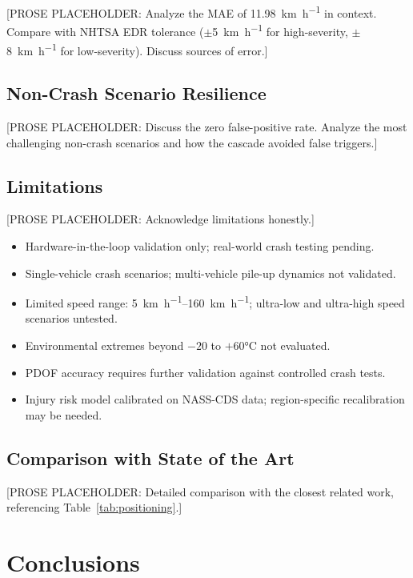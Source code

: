 \documentclass[conference,twocolumn]{IEEEtran}
\begin{document}
[PROSE PLACEHOLDER: Analyze the MAE of \SI{11.98}{\kilo\meter\per\hour} in context. Compare with NHTSA EDR tolerance ($\pm$\SI{5}{\kilo\meter\per\hour} for high-severity, $\pm$\SI{8}{\kilo\meter\per\hour} for low-severity). Discuss sources of error.]

\subsection{Non-Crash Scenario Resilience}

[PROSE PLACEHOLDER: Discuss the zero false-positive rate. Analyze the most challenging non-crash scenarios and how the cascade avoided false triggers.]

\subsection{Limitations}

[PROSE PLACEHOLDER: Acknowledge limitations honestly.]

\begin{itemize}
  \item Hardware-in-the-loop validation only; real-world crash testing pending.
  \item Single-vehicle crash scenarios; multi-vehicle pile-up dynamics not validated.
  \item Limited speed range: \SIrange{5}{160}{\kilo\meter\per\hour}; ultra-low and ultra-high speed scenarios untested.
  \item Environmental extremes beyond $-20$ to $+60$\si{\celsius} not evaluated.
  \item PDOF accuracy requires further validation against controlled crash tests.
  \item Injury risk model calibrated on NASS-CDS data; region-specific recalibration may be needed.
\end{itemize}

\subsection{Comparison with State of the Art}

[PROSE PLACEHOLDER: Detailed comparison with the closest related work, referencing Table~\ref{tab:positioning}.]

\section{Conclusions}
\end{document}

